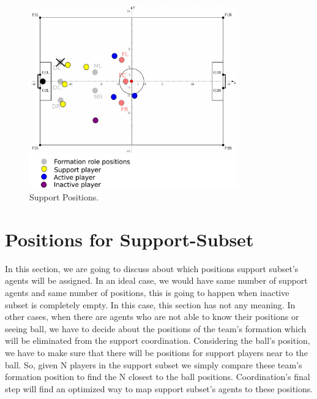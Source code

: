 \begin{figure}[t!]
\centering
  \includegraphics[width=0.8\textwidth]{Chapter4/figures/SupportPos.pdf}
  \caption{Support Positions.} 
  \label{fig:SupportPos}
\end{figure}

\section{Positions for Support-Subset}
In this section, we are going to discuss about which positions support subset's agents will be assigned. In an ideal case, we would have same number of support agents and same number of positions, this is going to happen when inactive subset is completely empty. In this case, this section has not any meaning. In other cases, when there are agents who are not able to know their positions or seeing ball, we have to decide about the positions of the team's formation which will be eliminated from the support coordination. Considering the ball's position, we have to make sure that there will be positions for support players near to the ball. So, given N players in the support subset we simply compare these team's formation position to find the N closest to the ball positions. Coordination's final step will find an optimized way to map support subset's agents to these positions.



